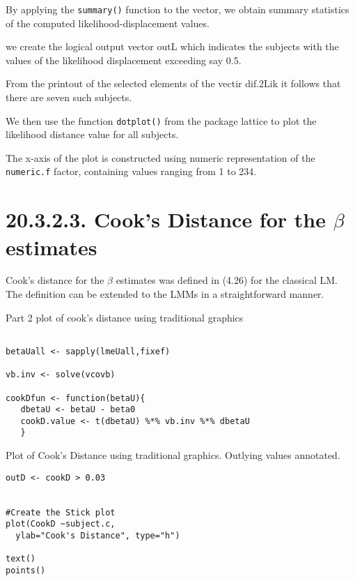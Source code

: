 \documentclass[a4paper,12pt]{article}
\begin{document}

By applying the \texttt{summary()} function to the vector, we obtain summary statistics of the computed likelihood-displacement values.

we create the logical output vector outL which indicates the subjects with the values of the 
likelihood displacement exceeding say 0.5.

From the printout of the selected elements of the vectir dif.2Lik it follows that there are
seven such subjects.


We then use the function \texttt{dotplot()} from the package lattice to plot the 
likelihood distance value for all subjects.

The x-axis of the plot is constructed using numeric representation of the \texttt{numeric.f} factor, containing values ranging from 1 to 234.
\section{20.3.2.3. Cook's Distance for the $\beta$ estimates}

Cook's distance for the $\beta$ estimates was defined in (4.26) for the classical LM.
The definition can be extended to the LMMs in a straightforward manner.


Part 2 plot of cook's distance using traditional graphics


\begin{framed}
\begin{verbatim}

betaUall <- sapply(lmeUall,fixef)

vb.inv <- solve(vcovb)

cookDfun <- function(betaU){
   dbetaU <- betaU - beta0
   cookD.value <- t(dbetaU) %*% vb.inv %*% dbetaU
   }
\end{verbatim}
\end{framed}

Plot of Cook's Distance using traditional graphics. 
Outlying values annotated.

\begin{framed}
\begin{verbatim}
outD <- cookD > 0.03


#Create the Stick plot
plot(CookD ~subject.c, 
  ylab="Cook's Distance", type="h")

text()
points()
\end{verbatim}
\end{framed}
\end{document}
